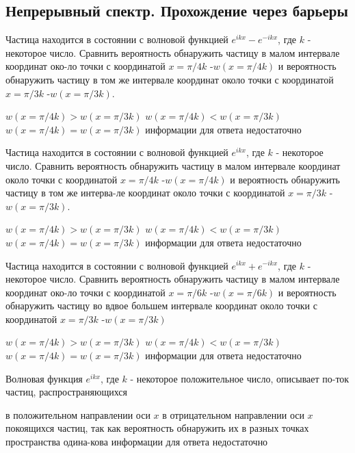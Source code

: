 \documentclass[11pt,a4paper]{exam}
\begin{document}
\subsection{ Непрерывный спектр. Прохождение через барьеры }


\begin{questions}

\question Частица находится в состоянии с волновой функцией ${e^{ikx}} - {e^{ - ikx}}$, где $k$ - некоторое число. Сравнить вероятность обнаружить частицу в малом интервале координат око-ло точки с координатой $x = \pi /4k$ -$w(x = \pi /4k)$ и вероятность обнаружить частицу в том же интервале координат около точки с координатой $x = \pi /3k$ -$w(x = \pi /3k)$.
\begin{choices}
\choice $w(x = \pi /4k) > w(x = \pi /3k)$         
\choice $w(x = \pi /4k) < w(x = \pi /3k)$
\choice $w(x = \pi /4k) = w(x = \pi /3k)$         
\choice информации для ответа недостаточно
\end{choices}

\question Частица находится в состоянии с волновой функцией ${e^{ikx}}$, где $k$ - некоторое число. Сравнить вероятность обнаружить частицу в малом интервале координат около точки с координатой $x = \pi /4k$ -$w(x = \pi /4k)$ и вероятность обнаружить частицу в том же интерва-ле координат около точки с координатой $x = \pi /3k$ -$w(x = \pi /3k)$.
\begin{choices}
\choice $w(x = \pi /4k) > w(x = \pi /3k)$            
\choice $w(x = \pi /4k) < w(x = \pi /3k)$   
\choice $w(x = \pi /4k) = w(x = \pi /3k)$            
\choice информации для ответа недостаточно
\end{choices}

\question Частица находится в состоянии с волновой функцией ${e^{ikx}} + {e^{ - ikx}}$, где $k$ - некоторое число. Сравнить вероятность обнаружить частицу в малом интервале координат око-ло точки с координатой $x = \pi /6k$ -$w(x = \pi /6k)$ и вероятность обнаружить частицу во вдвое большем интервале координат около точки с координатой $x = \pi /3k$ -$w(x = \pi /3k)$
\begin{choices}
\choice $w(x = \pi /4k) > w(x = \pi /3k)$            
\choice $w(x = \pi /4k) < w(x = \pi /3k)$
\choice $w(x = \pi /4k) = w(x = \pi /3k)$            
\choice информации для ответа недостаточно
\end{choices}

\question Волновая функция ${e^{ikx}}$, где $k$ - некоторое положительное число, описывает по-ток частиц, распространяющихся
\begin{choices}
\choice в положительном направлении оси $x$
\choice в отрицательном направлении оси $x$
\choice покоящихся частиц, так как вероятность обнаружить их в разных точках пространства одина-кова
\choice информации для ответа недостаточно
\end{choices}


\end{questions}
\end{document}
